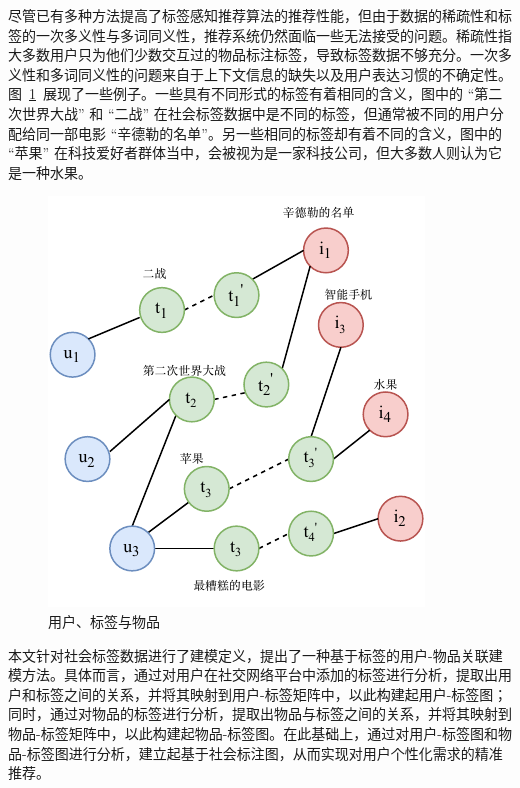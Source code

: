 尽管已有多种方法提高了标签感知推荐算法的推荐性能，但由于数据的稀疏性和标签的一次多义性与多词同义性，推荐系统仍然面临一些无法接受的问题\cite{shepitsen_personalized_2008}。稀疏性指大多数用户只为他们少数交互过的物品标注标签，导致标签数据不够充分。一次多义性和多词同义性的问题来自于上下文信息的缺失以及用户表达习惯的不确定性。图~\ref{fig:tags}~展现了一些例子。一些具有不同形式的标签有着相同的含义，图中的 “第二次世界大战” 和 “二战” 在社会标签数据中是不同的标签，但通常被不同的用户分配给同一部电影 “辛德勒的名单”。另一些相同的标签却有着不同的含义，图中的 “苹果” 在科技爱好者群体当中，会被视为是一家科技公司，但大多数人则认为它是一种水果。

\begin{figure}[!h]
    \centering
    \setlength{\belowcaptionskip}{-6mm}
    \includegraphics[width=0.4\linewidth]{figure/tags.drawio.pdf}
    \caption{用户、标签与物品}
    \label{fig:tags}
\end{figure}

本文针对社会标签数据进行了建模定义，提出了一种基于标签的用户-物品关联建模方法。具体而言，通过对用户在社交网络平台中添加的标签进行分析，提取出用户和标签之间的关系，并将其映射到用户-标签矩阵中，以此构建起用户-标签图；同时，通过对物品的标签进行分析，提取出物品与标签之间的关系，并将其映射到物品-标签矩阵中，以此构建起物品-标签图。在此基础上，通过对用户-标签图和物品-标签图进行分析，建立起基于社会标注图，从而实现对用户个性化需求的精准推荐。

